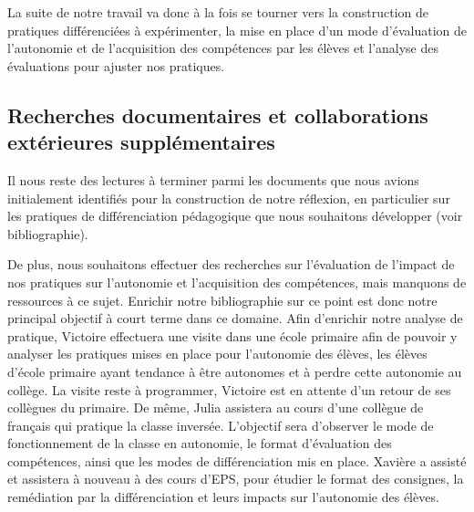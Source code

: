 La suite de notre travail va donc à la fois se tourner vers la construction de pratiques différenciées à expérimenter, la mise en place d’un mode d’évaluation de l’autonomie et de l’acquisition des compétences par les élèves et l’analyse des évaluations pour ajuster nos pratiques.

\subsection{Recherches documentaires et collaborations extérieures supplémentaires}

Il nous reste des lectures à terminer parmi les documents que nous avions initialement identifiés pour la construction de notre réflexion, en particulier sur les pratiques de différenciation pédagogique que nous souhaitons développer (voir bibliographie). 

De plus, nous souhaitons effectuer des recherches sur l’évaluation de l’impact de nos pratiques sur l’autonomie et l’acquisition des compétences, mais manquons de ressources à ce sujet. Enrichir notre bibliographie sur ce point est donc notre principal objectif à court terme dans ce domaine.
Afin d’enrichir notre analyse de pratique, Victoire effectuera une visite dans une école primaire afin de pouvoir y analyser les pratiques mises en place pour l’autonomie des élèves, les élèves d’école primaire ayant tendance à être autonomes et à perdre cette autonomie au collège.  La visite reste à programmer, Victoire est en attente d’un retour de ses collègues du primaire. De même, Julia assistera au cours d’une collègue de français qui pratique la classe inversée. L’objectif sera d’observer le mode de fonctionnement de la classe en autonomie, le format d’évaluation des compétences, ainsi que les modes de différenciation mis en place. Xavière a assisté et assistera à nouveau à des cours d’EPS, pour étudier le format des consignes, la remédiation par la différenciation et leurs impacts sur l’autonomie des élèves.